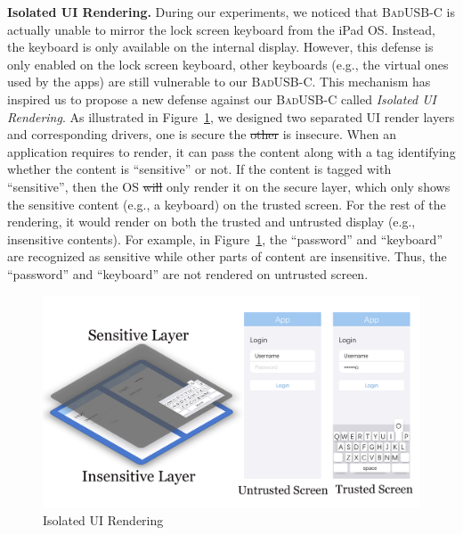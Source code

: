 \documentclass[conference]{IEEEtran}
\newcommand{\tool}{\mbox{\textsc{BadUSB-C}}\xspace}
\newcommand{\hongyi}[1]{}
\newcommand{\shuqing}[1]{}
\newcommand{\fengwei}[1]{}
\providecommand{\DIFaddtex}[1]{{\protect\color{blue}\uwave{#1}}} %
\providecommand{\DIFdeltex}[1]{{\protect\color{red}\sout{#1}}}                      %
\providecommand{\DIFaddbegin}{} %
\providecommand{\DIFaddend}{} %
\providecommand{\DIFdelbegin}{} %
\providecommand{\DIFdelend}{} %
\providecommand{\DIFadd}[1]{\texorpdfstring{\DIFaddtex{#1}}{#1}} %
\providecommand{\DIFdel}[1]{\texorpdfstring{\DIFdeltex{#1}}{}} %
\newcommand{\DIFscaledelfig}{0.5}
\newlength{\DIFdelgraphicswidth} %
\newlength{\DIFdelgraphicsheight} %
\newcommand{\DIFaddincludegraphics}[2][]{{\color{blue}\fbox{\DIFOincludegraphics[#1]{#2}}}} %
\newcommand{\DIFdelincludegraphics}[2][]{%
\sbox{\DIFdelgraphicsbox}{\DIFOincludegraphics[#1]{#2}}%
\settoboxwidth{\DIFdelgraphicswidth}{\DIFdelgraphicsbox} %
\settoboxtotalheight{\DIFdelgraphicsheight}{\DIFdelgraphicsbox} %
\scalebox{\DIFscaledelfig}{%
\parbox[b]{\DIFdelgraphicswidth}{\usebox{\DIFdelgraphicsbox}\\[-\baselineskip] \rule{\DIFdelgraphicswidth}{0em}}\llap{\resizebox{\DIFdelgraphicswidth}{\DIFdelgraphicsheight}{%
\setlength{\unitlength}{\DIFdelgraphicswidth}%
\begin{picture}(1,1)%
\thicklines\linethickness{2pt} %
{\color[rgb]{1,0,0}\put(0,0){\framebox(1,1){}}}%
{\color[rgb]{1,0,0}\put(0,0){\line( 1,1){1}}}%
{\color[rgb]{1,0,0}\put(0,1){\line(1,-1){1}}}%
\end{picture}%
}\hspace*{3pt}}} %
} %
\DeclareRobustCommand{\DIFaddbegin}{\DIFOaddbegin \let\includegraphics\DIFaddincludegraphics} %
\DeclareRobustCommand{\DIFaddend}{\DIFOaddend \let\includegraphics\DIFOincludegraphics} %
\DeclareRobustCommand{\DIFdelbegin}{\DIFOdelbegin \let\includegraphics\DIFdelincludegraphics} %
\DeclareRobustCommand{\DIFdelend}{\DIFOaddend \let\includegraphics\DIFOincludegraphics} %
\begin{document}
\textbf{Isolated \ac{UI} Rendering.} During our experiments, we noticed that \tool
is actually unable to mirror the lock screen keyboard from the iPad
OS. Instead, the keyboard is only available on the internal display. However,
this defense is only enabled on the lock screen keyboard, other keyboards
(e.g., the virtual ones used by the apps) are still vulnerable to our \tool.
This mechanism has inspired us to propose a new defense against our \tool
called \emph{Isolated \ac{UI} Rendering}. As illustrated in
Figure~\ref{fig:isolated_ui}, we designed two separated \ac{UI} render layers and corresponding drivers, one
is secure the \DIFdelbegin \DIFdel{other }\DIFdelend \DIFaddbegin \DIFadd{another }\DIFaddend is insecure. When an application requires to render, it can
pass the content along with a tag identifying whether the content is
``sensitive'' or not. If the content is tagged with ``sensitive'', then the OS
\DIFdelbegin \DIFdel{will }\DIFdelend \DIFaddbegin \DIFadd{could }\DIFaddend only render it on the secure layer, which only shows the sensitive content
(e.g., a keyboard) on the trusted screen. For the rest of the rendering, it
would render on both the trusted and untrusted display (e.g., insensitive
contents).
For example, in Figure~\ref{fig:isolated_ui}, the ``password'' and ``keyboard'' are recognized as sensitive while other parts of content are insensitive. Thus, the ``password'' and ``keyboard'' are not rendered on untrusted screen.

\begin{figure}[t]
	\centering
	\includegraphics[width=\linewidth]{./Figs/isolated_ui.png}
	\caption{Isolated \ac{UI} Rendering}%
	\label{fig:isolated_ui}
\end{figure}
\end{document}
